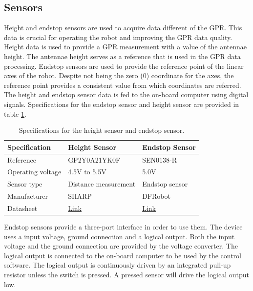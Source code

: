 \documentclass{article}
\begin{document}
\subsection{Sensors}
Height and endstop sensors are used to acquire data different of the GPR. This data is crucial for operating the robot and improving the GPR data quality. Height data is used to provide a GPR measurement 
with a value of the antennae height. The antennae height serves as a reference that is used in the GPR data processing. Endstop sensors are used to provide the reference point of the linear axes of the robot. Despite not being the zero (0) coordinate for the axes, the reference point provides a consistent value from which coordinates are referred. The height and endstop sensor data is fed to the on-board computer using digital signals. Specifications for the endstop sensor and height sensor are provided in table \ref{tab:sensors_specs}.

\begin{table}[h]
    \centering
    \begin{tabular}{|l|l|l|}
        \hline \textbf{Specification} & \textbf{Height Sensor} & \textbf{Endstop Sensor} \\ \hline
        Reference & GP2Y0A21YK0F & SEN0138-R \\ \hline
        Operating voltage & 4.5V to 5.5V & 5.0V \\ \hline
        Sensor type & Distance measurement & Endstop sensor \\ \hline
        Manufacturer & SHARP & DFRobot \\ \hline
        Datasheet & \href{https://www.pololu.com/file/0J85/gp2y0a21yk0f.pdf}{Link} & \href{https://www.dfrobot.com/product-763.html}{Link} \\ \hline
    \end{tabular}
    \caption{Specifications for the height sensor and endstop sensor.}
    \label{tab:sensors_specs}
\end{table}

Endstop sensors provide a three-port interface in order to use them. The device uses a input voltage, ground connection and a logical output. Both the input voltage and the ground connection are provided by the voltage converter. The logical output is connected to the on-board computer to be used by the control software. The logical output is continuously driven by an integrated pull-up resistor unless the switch is pressed. A pressed sensor will drive the logical output low.
\end{document}
